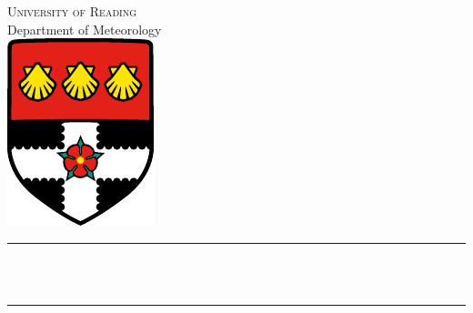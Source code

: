 \begin{titlingpage}
\makeatletter
\begin{center}
\textsc{\Large University of Reading} \\[12pt]
{\Large Department of Meteorology} \\[16pt]
\includegraphics{img/uor-logo} \\[48pt]

\rule{\textwidth}{.4pt} \\[12pt]
{ \huge \bfseries \@title \\[16pt] } \rule{\textwidth}{.4pt} \\[54pt]
{\LARGE \@author}
\vfill
{\Large \@date}
\end{center}
\makeatother
\end{titlingpage}
